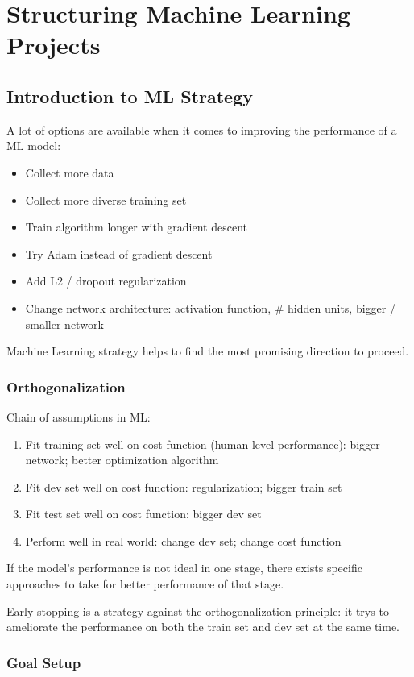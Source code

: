 \ifx\PREAMBLE\undefined


\fi
\chapter{Structuring Machine Learning Projects}
\section{Introduction to ML Strategy}
A lot of options are available when it comes to improving the performance of a ML model:
\begin{itemize}
  \item Collect more data
  \item Collect more diverse training set
  \item Train algorithm longer with gradient descent
  \item Try Adam instead of gradient descent
  \item Add L2 / dropout regularization
  \item Change network architecture: activation function, \# hidden units, bigger / smaller network
\end{itemize}
Machine Learning strategy helps to find the most promising direction to proceed.
\subsection{Orthogonalization}
Chain of assumptions in ML:
\begin{enumerate}
  \item Fit training set well on cost function (human level performance): bigger network; better optimization algorithm
  \item Fit dev set well on cost function: regularization; bigger train set
  \item Fit test set well on cost function: bigger dev set
  \item Perform well in real world: change dev set; change cost function
\end{enumerate}
If the model's performance is not ideal in one stage, there exists specific approaches to take for better performance of that stage.

Early stopping is a strategy against the orthogonalization principle: it trys to ameliorate the performance on both the train set and dev set at the same time.
\subsection{Goal Setup}
